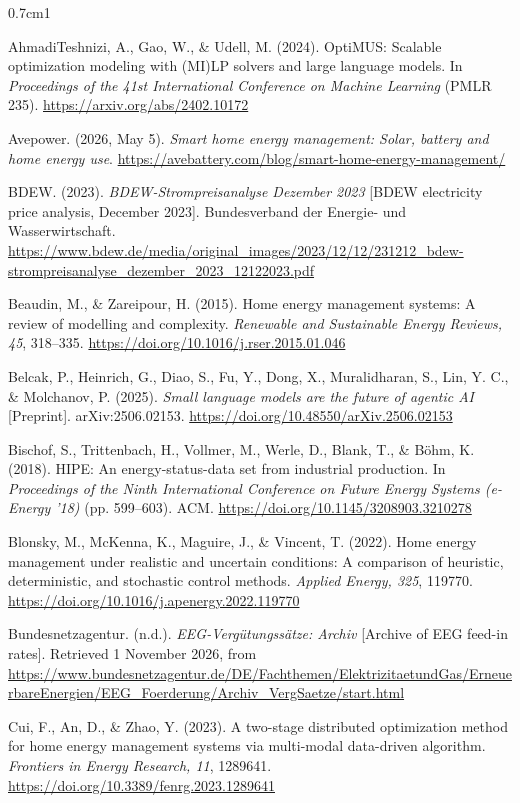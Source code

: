 \begin{hangparas}{0.7cm}{1}

AhmadiTeshnizi, A., Gao, W., \& Udell, M. (2024). OptiMUS: Scalable
optimization modeling with (MI)LP solvers and large language models. In
\textit{Proceedings of the 41st International Conference on Machine
Learning} (PMLR 235). \url{https://arxiv.org/abs/2402.10172}

Avepower. (2026, May 5). \textit{Smart home energy management: Solar,
battery and home energy use}.
\url{https://avebattery.com/blog/smart-home-energy-management/}

BDEW. (2023). \textit{BDEW-Strompreisanalyse Dezember 2023}
[BDEW electricity price analysis, December 2023]. Bundesverband der
Energie- und Wasserwirtschaft.
\url{https://www.bdew.de/media/original_images/2023/12/12/231212_bdew-strompreisanalyse_dezember_2023_12122023.pdf}

Beaudin, M., \& Zareipour, H. (2015). Home energy management systems: A
review of modelling and complexity. \textit{Renewable and Sustainable
Energy Reviews, 45}, 318--335.
\url{https://doi.org/10.1016/j.rser.2015.01.046}

Belcak, P., Heinrich, G., Diao, S., Fu, Y., Dong, X., Muralidharan, S.,
Lin, Y. C., \& Molchanov, P. (2025). \textit{Small language models are
the future of agentic AI} [Preprint]. arXiv:2506.02153.
\url{https://doi.org/10.48550/arXiv.2506.02153}

Bischof, S., Trittenbach, H., Vollmer, M., Werle, D., Blank, T., \&
Böhm, K. (2018). HIPE: An energy-status-data set from industrial
production. In \textit{Proceedings of the Ninth International
Conference on Future Energy Systems (e-Energy '18)} (pp. 599--603). ACM.
\url{https://doi.org/10.1145/3208903.3210278}

Blonsky, M., McKenna, K., Maguire, J., \& Vincent, T. (2022). Home
energy management under realistic and uncertain conditions: A comparison
of heuristic, deterministic, and stochastic control methods.
\textit{Applied Energy, 325}, 119770.
\url{https://doi.org/10.1016/j.apenergy.2022.119770}

Bundesnetzagentur. (n.d.). \textit{EEG-Vergütungssätze: Archiv}
[Archive of EEG feed-in rates]. Retrieved 1 November 2026, from
\url{https://www.bundesnetzagentur.de/DE/Fachthemen/ElektrizitaetundGas/ErneuerbareEnergien/EEG_Foerderung/Archiv_VergSaetze/start.html}

Cui, F., An, D., \& Zhao, Y. (2023). A two-stage distributed
optimization method for home energy management systems via multi-modal
data-driven algorithm. \textit{Frontiers in Energy Research, 11},
1289641. \url{https://doi.org/10.3389/fenrg.2023.1289641}


\end{hangparas}
